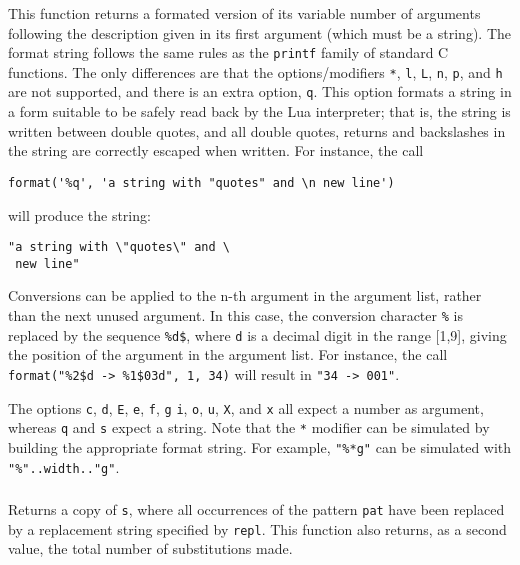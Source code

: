 \subsubsection*{\ff {}}
\label{format}
This function returns a formated version of its variable number of arguments
following the description given in its first argument (which must be a string).
The format string follows the same rules as the \verb|printf| family of
standard C functions.
The only differences are that the options/modifiers
\verb|*|, \verb|l|, \verb|L|, \verb|n|, \verb|p|,
and \verb|h| are not supported,
and there is an extra option, \verb|q|.
This option formats a string in a form suitable to be safely read
back by the Lua interpreter;
that is,
the string is written between double quotes,
and all double quotes, returns and backslashes in the string
are correctly escaped when written.
For instance, the call
\begin{verbatim}
format('%q', 'a string with "quotes" and \n new line')
\end{verbatim}
will produce the string:
\begin{verbatim}
"a string with \"quotes\" and \
 new line"
\end{verbatim}

Conversions can be applied to the n-th argument in the argument list,
rather than the next unused argument.
In this case, the conversion character \verb|%| is replaced
by the sequence \verb|%d$|, where \verb|d| is a
decimal digit in the range [1,9],
giving the position of the argument in the argument list.
For instance, the call \verb|format("%2$d -> %1$03d", 1, 34)| will
result in \verb|"34 -> 001"|.

The options \verb|c|, \verb|d|, \verb|E|, \verb|e|, \verb|f|,
\verb|g| \verb|i|, \verb|o|, \verb|u|, \verb|X|, and \verb|x| all
expect a number as argument,
whereas \verb|q| and \verb|s| expect a string.
Note that the \verb|*| modifier can be simulated by building
the appropriate format string.
For example, \verb|"%*g"| can be simulated with
\verb|"%"..width.."g"|.

\subsubsection*{\ff {}}
Returns a copy of \verb|s|,
where all occurrences of the pattern \verb|pat| have been
replaced by a replacement string specified by \verb|repl|.
This function also returns, as a second value,
the total number of substitutions made.

